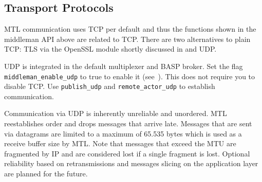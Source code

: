 \subsection{Transport Protocols \experimental}
\label{transport-protocols}

MTL communication uses TCP per default and thus the functions shown in the
middleman API above are related to TCP. There are two alternatives to plain
TCP: TLS via the OpenSSL module shortly discussed in
 and UDP.

UDP is integrated in the default multiplexer and BASP broker. Set the flag
\lstinline^middleman_enable_udp^ to true to enable it
(see~). This does not require you to disable TCP. Use
\lstinline^publish_udp^ and \lstinline^remote_actor_udp^ to establish
communication.

Communication via UDP is inherently unreliable and unordered. MTL reestablishes
order and drops messages that arrive late. Messages that are sent via datagrams
are limited to a maximum of 65.535 bytes which is used as a receive buffer size
by MTL. Note that messages that exceed the MTU are fragmented by IP and are
considered lost if a single fragment is lost. Optional reliability based on
retransmissions and messages slicing on the application layer are planned for
the future.
